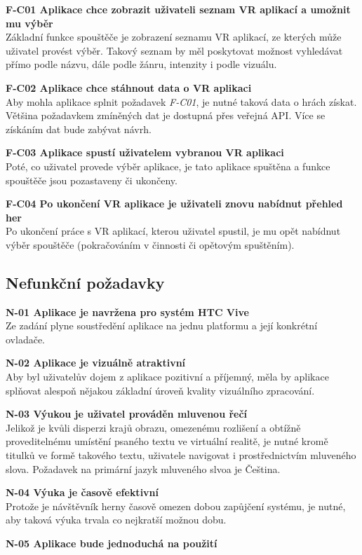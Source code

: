 \textbf{F-C01 Aplikace chce zobrazit uživateli seznam VR aplikací a
umožnit mu výběr}\\
Základní funkce spouštěče je zobrazení seznamu VR aplikací, ze kterých
může uživatel provést výběr. Takový seznam by měl poskytovat možnost
vyhledávat přímo podle názvu, dále podle žánru, intenzity i podle
vizuálu.

\textbf{F-C02 Aplikace chce stáhnout data o VR aplikaci}\\
Aby mohla aplikace splnit požadavek \emph{F-C01}, je nutné taková data o
hrách získat. Většina požadavkem zmíněných dat je dostupná přes veřejná
API. Více se získáním dat bude zabývat návrh.

\textbf{F-C03 Aplikace spustí uživatelem vybranou VR aplikaci}\\
Poté, co uživatel provede výběr aplikace, je tato aplikace spuštěna a
funkce spouštěče jsou pozastaveny či ukončeny.

\textbf{F-C04 Po ukončení VR aplikace je uživateli znovu nabídnut
přehled her}\\
Po ukončení práce s VR aplikací, kterou uživatel spustil, je mu opět
nabídnut výběr spouštěče (pokračováním v činnosti či opětovým
spuštěním).

\subsection{Nefunkční požadavky}\label{nefunkux10dnuxed-poux17eadavky}

\textbf{N-01 Aplikace je navržena pro systém HTC Vive}\\
Ze zadání plyne soustředění aplikace na jednu platformu a její konkrétní
ovladače.

\textbf{N-02 Aplikace je vizuálně atraktivní}\\
Aby byl uživatelův dojem z aplikace pozitivní a příjemný, měla by
aplikace splňovat alespoň nějakou základní úroveň kvality vizuálního
zpracování.

\textbf{N-03 Výukou je uživatel prováděn mluvenou řečí}\\
Jelikož je kvůli disperzi krajů obrazu, omezenému rozlišení a obtížně
proveditelnému umístění psaného textu ve virtuální realitě, je nutné
kromě titulků ve formě takového textu, uživatele navigovat i
prostřednictvím mluveného slova. Požadavek na primární jazyk mluveného
slvoa je Čeština.

\textbf{N-04 Výuka je časově efektivní}\\
Protože je návštěvník herny časově omezen dobou zapůjčení systému, je
nutné, aby taková výuka trvala co nejkratší možnou dobu.

\textbf{N-05 Aplikace bude jednoduchá na použití}
